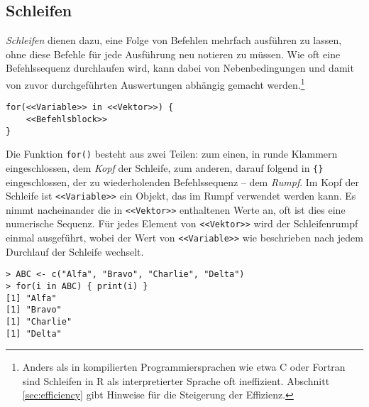 \subsection{Schleifen}
\label{sec:loops}

\emph{Schleifen} dienen dazu, eine Folge von Befehlen mehrfach ausführen zu lassen, ohne diese Befehle für jede Ausführung neu notieren zu müssen. Wie oft eine Befehlssequenz durchlaufen wird, kann dabei von Nebenbedingungen und damit von zuvor durchgeführten Auswertungen abhängig gemacht werden.\footnote{Anders als in kompilierten Programmiersprachen wie etwa C oder Fortran sind Schleifen in R als interpretierter Sprache oft ineffizient. Abschnitt \ref{sec:efficiency} gibt Hinweise für die Steigerung der Effizienz.}
\begin{lstlisting}
for(<<Variable>> in <<Vektor>>) {
    <<Befehlsblock>>
}
\end{lstlisting}

Die Funktion \lstinline!for()! besteht aus zwei Teilen: zum einen, in runde Klammern eingeschlossen, dem \emph{Kopf} der Schleife, zum anderen, darauf folgend in \lstinline!{}! eingeschlossen, der zu wiederholenden Befehlssequenz -- dem \emph{Rumpf}. Im Kopf der Schleife ist \lstinline!<<Variable>>! ein Objekt, das im Rumpf verwendet werden kann. Es nimmt nacheinander die in \lstinline!<<Vektor>>! enthaltenen Werte an, oft ist dies eine numerische Sequenz. Für jedes Element von \lstinline!<<Vektor>>! wird der Schleifenrumpf einmal ausgeführt, wobei der Wert von \lstinline!<<Variable>>! wie beschrieben nach jedem Durchlauf der Schleife wechselt.
\begin{lstlisting}
> ABC <- c("Alfa", "Bravo", "Charlie", "Delta")
> for(i in ABC) { print(i) }
[1] "Alfa"
[1] "Bravo"
[1] "Charlie"
[1] "Delta"
\end{lstlisting}

